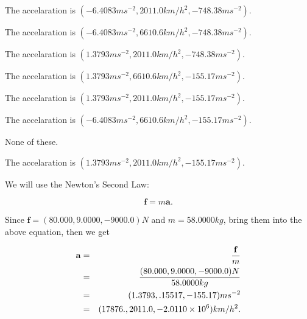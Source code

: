 \documentclass[12pt]{article}
\begin{document}
The accelaration is
$(
-6.4083ms^{-2},
2011.0km/h^2,
-748.38ms^{-2}
).
$
 
 
The accelaration is
$(
-6.4083ms^{-2},
6610.6km/h^2,
-748.38ms^{-2}
).
$
 
 
The accelaration is
$(
1.3793ms^{-2},
2011.0km/h^2,
-748.38ms^{-2}
).
$
 
 
The accelaration is
$(
1.3793ms^{-2},
6610.6km/h^2,
-155.17ms^{-2}
).
$
 
 
The accelaration is
$(
1.3793ms^{-2},
2011.0km/h^2,
-155.17ms^{-2}
).
$
 
 
The accelaration is
$(
-6.4083ms^{-2},
6610.6km/h^2,
-155.17ms^{-2}
).
$
 
 
 None of these.
 
 
\noindent{}
 
 
The accelaration is
$(
1.3793ms^{-2},
2011.0km/h^2,
-155.17ms^{-2}
).
$
 
 
\noindent{}
 
 
 
 
 
 
\noindent{}
 
 

We will use the Newton's Second Law:
 
\[
\mathbf{f}=m\mathbf{a}.
\]
 
Since $\mathbf{f}=( %
80.000,  %
9.0000,  %
-9000.0 )N$
and $m= %
58.0000kg$, bring them into the above equation, then we get
 
\begin{eqnarray*}
\mathbf{a}&=&\frac{\mathbf{f}}m  \\
&=&\frac{(
80.000 ,
9.0000 ,
-9000.0 )N
}{ %
58.0000 kg}  \\
&=&(
1.3793 ,
.15517,
-155.17
)ms^{-2} \\
&=&(
17876. ,
2011.0 ,
-2.0110 \times 10^{6}
)km/h^2.
\end{eqnarray*}
 
 
 
\noindent{}
 
\end{document}

